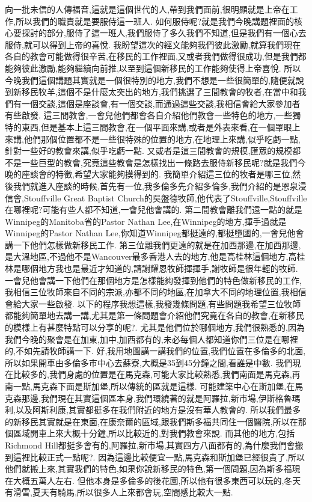\documentclass{book}
\begin{document}
向一批未信的人傳福音,這就是這個世代的人,帶到我們面前,很明顯就是上帝在工作,所以我們的職責就是要服侍這一班人.
如何服侍呢?就是我們今晚講題裡面的核心要探討的部分,服侍了這一班人,我們服侍了多久我們不知道,但是我們有一個心去服侍,就可以得到上帝的喜悅.
我盼望這次的經文能夠我們彼此激勵,就算我們現在各自的教會可能做得很辛苦,在移民的工作裡面,又或者我們做得很成功,但是我們都能夠彼此激勵,能夠繼續向前推,以至到這個新移民的工作能夠使得上帝喜悅.
所以今晚我們這個講題其實就是一個很特別的地方,我們不想是一些很簡單的,隨便就說到新移民牧羊,這個不是什麼太突出的地方,我們挑選了三間教會的牧者,在當中和我們有一個交談,這個是座談會,有一個交談,而通過這些交談,我相信會給大家參加者有些啟發.
這三間教會,一會兒他們都會各自介紹他們教會一些特色的地方,一些獨特的東西,但是基本上這三間教會,在一個平面來講,或者是外表來看,在一個罩眼上來講,他們那個位置都不是一些很特殊的位置的地方,在地理上來講,似乎吃虧一點,針對一些好的教會來講,似乎吃虧一點.
又或者是這三間教會的規模,匯眾的規模都不是一些巨型的教會,究竟這些教會是怎樣找出一條路去服侍新移民呢?就是我們今晚的座談會的特徵,希望大家能夠摸得到的.
我簡單介紹這三位的牧者是哪三位,然後我們就進入座談的時候,首先有一位,我多倫多先介紹多倫多,我們介紹的是恩泉浸信會,Stouffville Great Baptist Church的吳盤德牧師,他代表了Stouffville,Stouffville在哪裡呢?可能有些人都不知道,一會兒他會講的.
第二間教會離我們遠一點的就是Winnipeg的Manitoba省的Pastor Nathan Lee,在Winnipeg的地方,揮手過就是Winnipeg的Pastor Nathan Lee,你知道Winnipeg都挺遠的,都挺墮國的,一會兒他會講一下他們怎樣做新移民工作.
第三位離我們更遠的就是在加西那邊,在加西那邊,是大溫地區,不過他不是Wancouver最多香港人去的地方,他是高桂林這個地方,高桂林是哪個地方我也是最近才知道的,請謝耀恩牧師揮揮手,謝牧師是很年輕的牧師.
一會兒他會講一下他們在那個地方是怎樣能夠發揮到他們的特色做新移民的工作,我相信三位牧師來自不同的宗派,亦都不同的地區,在加拿大不同的地理位置,我相信會給大家一些啟發.
以下的程序我想這樣,我發幾條問題,有些問題我希望三位牧師都能夠簡單地去講一講,尤其是第一條問題會介紹他們究竟在各自的教會,在新移民的模樣上有甚麼特點可以分享的呢?.
尤其是他們位於哪個地方,我們很熟悉的,因為我們今晚的聚會是在加東,加中,加西都有的,未必每個人都知道你們三位是在哪裡的,不如先請牧師講一下.
好,我用地圖講一講我們的位置,我們位置在多倫多的北面,所以如果開車由多倫多市中心去蘇寮,大概是35到45分鐘之間,看誰是中數.
我們現在比較多的,我們身處的位置是在馬克森,可能大家比較熟悉,我們南面是馬克森,再南一點,馬克森下面是斯加堡,所以傳統的區就是這樣.
可能建築中心在斯加堡,在馬克森那邊,我們現在其實這個區本身,我們環繞著的就是阿羅拉,新市場,伊斯格魯瑪利,以及阿斯利康,其實都挺多在我們附近的地方是沒有華人教會的.
所以我們最多的新移民其實就是在東面,在康奈爾的區域,跟我們斯多福共同住一個醫院,所以在那個區域開車上來大概十分鐘,所以比較近的,對我們教會來說.
而其他的地方,包括Richmond Hill都挺多會有的,阿羅拉,新市場,其實四方八面都有的,為什麼我們會搬到這裡比較正式一點呢?.
因為這邊比較便宜一點,馬克森和斯加堡已經很貴了,所以他們就搬上來,其實我們的特色,如果你說新移民的特色,第一個問題,因為斯多福現在大概五萬人左右.
但他本身是多倫多的後花園,所以他有很多東西可以玩的,冬天有滑雪,夏天有騎馬,所以很多人上來都會玩,空間感比較大一點.
\end{document}

